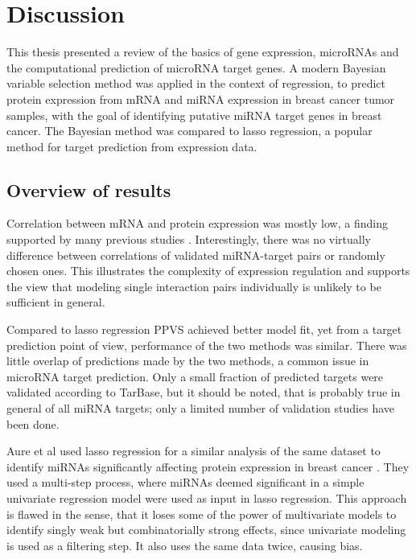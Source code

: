
\section{Discussion}

This thesis presented a review of the basics of gene expression, microRNAs and
the computational prediction of microRNA target genes. A modern Bayesian
variable selection method was applied in the context of regression, to predict
protein expression from mRNA and miRNA expression in breast cancer tumor
samples, with the goal of identifying putative miRNA target genes in breast
cancer. The Bayesian method was compared to lasso regression, a popular method
for target prediction from expression data.

\subsection*{Overview of results}

Correlation between mRNA and protein expression was mostly low, a finding
supported by many previous studies \citep{Payne2015}. Interestingly, there was
no virtually difference between correlations of validated miRNA-target pairs
or randomly chosen ones. This illustrates the complexity of expression
regulation and supports the view that modeling single interaction pairs
individually is unlikely to be sufficient in general.

Compared to lasso regression PPVS achieved better model fit, yet from a target
prediction point of view, performance of the two methods was similar.
There was little overlap of predictions made by the two methods, a common
issue in microRNA target prediction. Only a small fraction of predicted
targets were validated according to TarBase, but it should be noted, that is
probably true in general of all miRNA targets; only a limited number of
validation studies have been done.

Aure et al used lasso regression for a similar analysis of the same dataset
to identify miRNAs significantly affecting protein expression in breast cancer
\citep{Aure2015}. They used a multi-step process, where miRNAs deemed
significant in a simple univariate regression model were used as input in
lasso regression. This approach is flawed in the sense, that it loses some of
the power of multivariate models to identify singly weak but combinatorially
strong effects, since univariate modeling is used as a filtering step. It also
uses the same data twice, causing bias.

